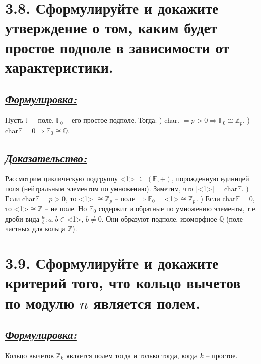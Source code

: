 \documentclass{article}
\begin{document}
\section*{\LARGE 3.8. Сформулируйте и докажите утверждение о том, каким будет простое подполе в зависимости от характеристики. }
\subsection*{\Large \underline{\textit{Формулировка: }}}
Пусть $\mathbb{F}$ -- поле, $\mathbb{F}_0$ -- его простое подполе. Тогда:
\newline{}) char$\mathbb{F} = p > 0 \Rightarrow \mathbb{F}_0 \cong \mathbb{Z}_p$. 
\newline{}) char$\mathbb{F} = 0 \Rightarrow \mathbb{F}_0 \cong \mathbb{Q}$. 

\subsection*{\Large \underline{\textit{Доказательство:}}}
Рассмотрим циклическую подгруппу <1> $\subseteq (\mathbb{F}, +)$, порожденную единицей поля (нейтральным элементом по умножению). Заметим, что |<1>| = char$\mathbb{F}$.
) Если char$\mathbb{F} = p > 0$, то <1> $\cong \mathbb{Z}_p$ -- поле $\Rightarrow \mathbb{F}_0 = $<1>$\cong \mathbb{Z}_p$.
) Если char$\mathbb{F} = 0$, то <1>$\cong \mathbb{Z}$ -- не поле. Но $\mathbb{F}_0$ содержит и обратные по умножению элементы, т.е. дроби вида $\frac{a}{b} : a,b \in$<1>, $b \ne 0$. Они образуют подполе, изоморфное $\mathbb{Q}$ (поле частных для кольца $\mathbb{Z}$).

\section*{\LARGE 3.9. Сформулируйте и докажите критерий того, что кольцо вычетов по модулю $n$ является полем. }
\subsection*{\Large \underline{\textit{Формулировка: }}}
Кольцо вычетов $\mathbb{Z}_k$ является полем тогда и только тогда, когда $k$ -- простое.
\end{document}
